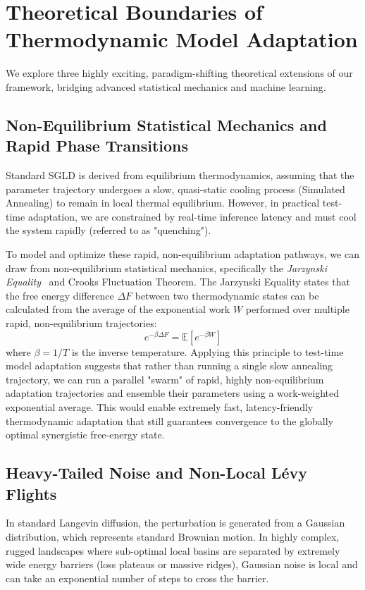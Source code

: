 \documentclass{article}
\theoremstyle{plain}
\theoremstyle{definition}
\theoremstyle{remark}
\begin{document}
\section{Theoretical Boundaries of Thermodynamic Model Adaptation}
\label{sec:theoretical_extensions}

We explore three highly exciting, paradigm-shifting theoretical extensions of our framework, bridging advanced statistical mechanics and machine learning.

\subsection{Non-Equilibrium Statistical Mechanics and Rapid Phase Transitions}
Standard SGLD is derived from equilibrium thermodynamics, assuming that the parameter trajectory undergoes a slow, quasi-static cooling process (Simulated Annealing) to remain in local thermal equilibrium. However, in practical test-time adaptation, we are constrained by real-time inference latency and must cool the system rapidly (referred to as "quenching"). 

To model and optimize these rapid, non-equilibrium adaptation pathways, we can draw from non-equilibrium statistical mechanics, specifically the \emph{Jarzynski Equality}~\cite{jarzynski1997equilibrium} and Crooks Fluctuation Theorem. The Jarzynski Equality states that the free energy difference $\Delta F$ between two thermodynamic states can be calculated from the average of the exponential work $W$ performed over multiple rapid, non-equilibrium trajectories:
\begin{equation}
    e^{-\beta \Delta F} = \mathbb{E}\left[ e^{-\beta W} \right]
\end{equation}
where $\beta = 1/T$ is the inverse temperature. Applying this principle to test-time model adaptation suggests that rather than running a single slow annealing trajectory, we can run a parallel "swarm" of rapid, highly non-equilibrium adaptation trajectories and ensemble their parameters using a work-weighted exponential average. This would enable extremely fast, latency-friendly thermodynamic adaptation that still guarantees convergence to the globally optimal synergistic free-energy state.

\subsection{Heavy-Tailed Noise and Non-Local Lévy Flights}
In standard Langevin diffusion, the perturbation is generated from a Gaussian distribution, which represents standard Brownian motion. In highly complex, rugged landscapes where sub-optimal local basins are separated by extremely wide energy barriers (loss plateaus or massive ridges), Gaussian noise is local and can take an exponential number of steps to cross the barrier.
\end{document}
